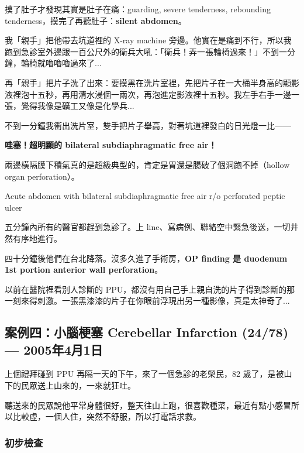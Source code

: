 \documentclass[12pt,a4paper]{article}
\newenvironment{myquote}{%
    \begin{tcolorbox}[
        colback=quote_bg,
        colframe=emergency_gray,
        boxrule=0pt,
        leftrule=3pt,
        arc=0pt,
        left=10pt,
        right=10pt,
        top=8pt,
        bottom=8pt
    ]
    \itshape
}{%
    \end{tcolorbox}
}
\begin{document}
摸了肚子才發現其實是肚子在痛：guarding, severe tenderness, rebounding tenderness，摸完了再聽肚子：\textbf{silent abdomen}。

我「親手」把他帶去坑道裡的 X-ray machine 旁邊。他實在是痛到不行，所以我跑到急診室外邊跟一百公尺外的衛兵大吼：「衛兵！弄一張輪椅過來！」不到一分鐘，輪椅就嚕嚕嚕過來了...

再「親手」把片子洗了出來：要摸黑在洗片室裡，先把片子在一大桶半身高的顯影液裡泡十五秒，再用清水浸個一兩次，再泡進定影液裡十五秒。我左手右手一邊一張，覺得我像是礦工又像是化學兵...

不到一分鐘我衝出洗片室，雙手把片子舉高，對著坑道裡發白的日光燈一比——

\begin{center}
\textbf{\Large\color{emergency_red} 哇塞！超明顯的 bilateral subdiaphragmatic free air！}
\end{center}

兩邊橫隔膜下積氣真的是超級典型的，肯定是胃還是腸破了個洞跑不掉（hollow organ perforation）。

\begin{tcolorbox}[
    colback=emergency_blue!10!white,
    colframe=emergency_blue,
    title=\textbf{Diagnosis},
    fonttitle=\bfseries
]
Acute abdomen with bilateral subdiaphragmatic free air r/o perforated peptic ulcer
\end{tcolorbox}

五分鐘內所有的醫官都趕到急診了。上 line、寫病例、聯絡空中緊急後送，一切井然有序地進行。

四十分鐘後他們在台北降落。沒多久進了手術房，\textbf{OP finding 是 duodenum 1st portion anterior wall perforation}。

\begin{myquote}
以前在醫院裡看別人診斷的 PPU，都沒有用自己手上親自洗的片子得到診斷的那一刻來得刺激。一張黑漆漆的片子在你眼前浮現出另一種影像，真是太神奇了...
\end{myquote}

\subsection{案例四：小腦梗塞 Cerebellar Infarction (24/78) — 2005年4月1日}

上個禮拜碰到 PPU 再隔一天的下午，來了一個急診的老榮民，82 歲了，是被山下的民眾送上山來的，一來就狂吐。

聽送來的民眾說他平常身體很好，整天往山上跑，很喜歡種菜，最近有點小感冒所以比較虛，一個人住，突然不舒服，所以打電話求救。

\subsubsection{初步檢查}
\end{document}

